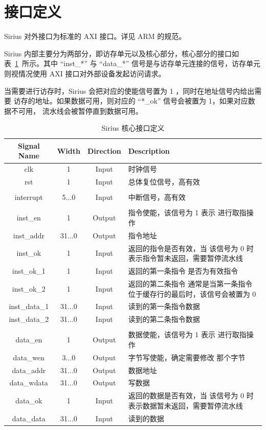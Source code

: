 \documentclass[blue,normal,cn,hide]{elegantbook}
\begin{document}
\section{接口定义}

Sirius 对外接口为标准的 AXI 接口。详见 ARM 的规范。

Sirius 内部主要分为两部分，即访存单元以及核心部分，核心部分的接口如
表~\ref{tab:SiriusCoreInterface}~所示。其中 ``inst\_*'' 与 ``data\_*''
信号是与访存单元连接的信号，访存单元则视情况使用 AXI 接口对外部设备发起访问请求。

当需要进行访存时，Sirius 会把对应的使能信号置为 1 ，同时在地址信号内给出需要
访存的地址。如果数据可用，则对应的 ``*\_ok'' 信号会被置为 1，如果对应数据不可用，
流水线会被暂停直到数据可用。

\begin{table}
    \renewcommand\arraystretch{1.25}
    \centering
    \begin{tabular}{cccm{}}
        \toprule 
        \rowcolor{black!20} \textbf{Signal Name} & \textbf{Width} & \textbf{Direction} & \textbf{Description} \\
        \midrule
        clk & 1 & Input & 时钟信号 \\
        rst & 1 & Input & 总体复位信号，高有效 \\
        \\
        interrupt & 5...0 & Input & 中断信号，高有效 \\
        \\
        inst\_en & 1 & Output & 指令使能，该信号为 1 表示
        进行取指操作 \\
        inst\_addr & 31...0 & Output & 指令地址 \\
        inst\_ok & 1 & Input & 返回的指令是否有效，当
        该信号为 0 时表示指令暂未返回，需要暂停流水线 \\
        inst\_ok\_1 & 1 & Input & 返回的第一条指令
        是否为有效指令 \\
        inst\_ok\_2 & 1 & Input & 返回的第二条指令
        通常是当第一条指令位于缓存行的最后时，该信号会被置为 0 \\
        inst\_data\_1 & 31...0 & Input & 读到的第一条指令数据 \\
        inst\_data\_2 & 31...0 & Input & 读到的第二条指令数据 \\
        \\
        data\_en & 1 & Output & 数据使能，该信号为 1 表示
        进行取指操作 \\
        data\_wen & 3...0 & Output & 字节写使能，确定需要修改
        那个字节 \\
        data\_addr & 31...0 & Output & 数据地址 \\
        data\_wdata & 31...0 & Output & 写数据 \\
        data\_ok & 1 & Input & 返回的数据是否有效，当
        该信号为 0 时表示数据暂未返回，需要暂停流水线 \\
        data\_data & 31...0 & Input & 读到的数据 \\
        \bottomrule
    \end{tabular}
    \caption{Sirius 核心接口定义}
    \label{tab:SiriusCoreInterface}
\end{table}
\end{document}
